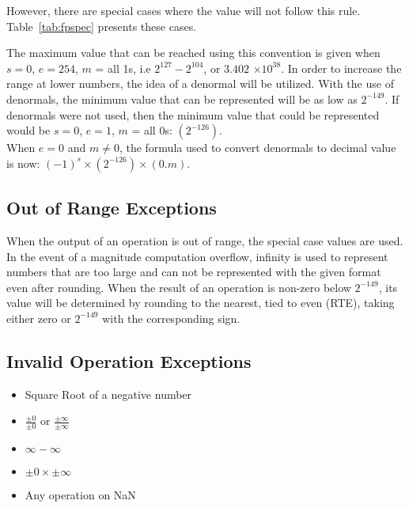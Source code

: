\documentclass[11pt]{report}
\begin{document}
\noindent
However, there are special cases where the value will not follow this rule. Table~\ref{tab:fpspec} presents these cases.


\noindent
The maximum value that can be reached using this convention is given when $s = 0$, $e = 254$, $m$ = all 1s, i.e $2^{127}- 2^{104}$, or $3.402$  $\times 10^{38}$. In order to increase the range at lower numbers, the idea of a denormal will be utilized. With the use of denormals, the minimum value that can be represented will be as low as $2^{-149}$. If denormals were not used, then the minimum value that could be represented would be $s = 0$, $e = 1$, $m$ = all 0s: $(2 ^{- 126})$.\\

\noindent
When $e = 0$ and $m \neq 0$, the formula used to convert denormals to decimal value is now: $(-1)^{s} \times (2^{-126}) \times (0.m)$. 

\subsection{Out of Range Exceptions}
\noindent
When the output of an operation is out of range, the special case values are used. In the event of a magnitude computation overflow, infinity is used to represent numbers that are too large and can not be represented with the given format even after rounding. When the result of an operation is non-zero below $2^{-149}$, its value will be determined by rounding to the nearest, tied to even (RTE), taking either zero or $2^{-149}$ with the corresponding sign.

\subsection{Invalid Operation Exceptions}
\begin{itemize}
\item Square Root of a negative number
\item $\frac{\pm0}{\pm0}$ or $\frac{\pm\infty}{\pm\infty}$
\item $\infty - \infty$
\item $\pm0 \times \pm\infty$
\item Any operation on NaN
\end{itemize}
\end{document}
